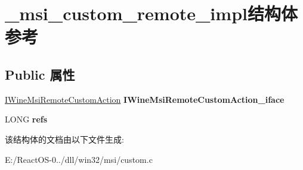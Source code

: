\hypertarget{struct__msi__custom__remote__impl}{}\section{\+\_\+msi\+\_\+custom\+\_\+remote\+\_\+impl结构体 参考}
\label{struct__msi__custom__remote__impl}
\subsection*{Public 属性}
\begin{DoxyCompactItemize}
\item 
\mbox{\label{struct__msi__custom__remote__impl_a533d58cb5c4558332a7ac44ada6904d1}} 
\hyperlink{interface_i_wine_msi_remote_custom_action}{I\+Wine\+Msi\+Remote\+Custom\+Action} {\bfseries I\+Wine\+Msi\+Remote\+Custom\+Action\+\_\+iface}
\item 
\mbox{\label{struct__msi__custom__remote__impl_a7275ac33347515f4720afe802e0ed993}} 
L\+O\+NG {\bfseries refs}
\end{DoxyCompactItemize}


该结构体的文档由以下文件生成\+:\begin{DoxyCompactItemize}
\item 
E\+:/\+React\+O\+S-\/0../dll/win32/msi/custom.\+c\end{DoxyCompactItemize}
